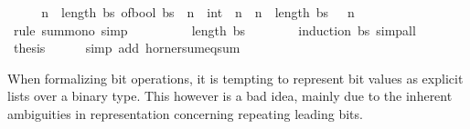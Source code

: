\begin{isabellebody}
%
\isadelimproof
%
\endisadelimproof
%
\isatagproof
{}\isamarkupfalse%
\ {\isacharminus}{\kern0pt}\isanewline
\ \ \isamarkupfalse%
\ {\isacartoucheopen}{\isacharparenleft}{\kern0pt}{\isasymSum}n\ {\isacharequal}{\kern0pt}\ {}{\isachardot}{\kern0pt}{\isachardot}{\kern0pt}{\isacharless}{\kern0pt}length\ bs{\isachardot}{\kern0pt}\ of{\isacharunderscore}{\kern0pt}bool\ {\isacharparenleft}{\kern0pt}bs\ {\isacharbang}{\kern0pt}\ n{\isacharparenright}{\kern0pt}\ {\isacharasterisk}{\kern0pt}\ {\isacharparenleft}{\kern0pt}{}{\isacharcolon}{\kern0pt}{\isacharcolon}{\kern0pt}int{\isacharparenright}{\kern0pt}\ {\isacharcircum}{\kern0pt}\ n{\isacharparenright}{\kern0pt}\ {\isasymle}\ {\isacharparenleft}{\kern0pt}{\isasymSum}n\ {\isacharequal}{\kern0pt}\ {}{\isachardot}{\kern0pt}{\isachardot}{\kern0pt}{\isacharless}{\kern0pt}length\ bs{\isachardot}{\kern0pt}\ {}\ {\isacharcircum}{\kern0pt}\ n{\isacharparenright}{\kern0pt}{\isacartoucheclose}\isanewline
\ \ \ \ \isamarkupfalse%
\ {\isacharparenleft}{\kern0pt}rule\ sum{\isacharunderscore}{\kern0pt}mono{\isacharparenright}{\kern0pt}\ simp\isanewline
\ \ \isamarkupfalse%
\ \isamarkupfalse%
\ {\isacartoucheopen}{\isasymdots}\ {\isacharequal}{\kern0pt}\ {}\ {\isacharcircum}{\kern0pt}\ length\ bs\ {\isacharminus}{\kern0pt}\ {}{\isacartoucheclose}\isanewline
\ \ \ \ \isamarkupfalse%
\ {\isacharparenleft}{\kern0pt}induction\ bs{\isacharparenright}{\kern0pt}\ simp{\isacharunderscore}{\kern0pt}all\isanewline
\ \ \isamarkupfalse%
\ \isamarkupfalse%
\ {\isacharquery}{\kern0pt}thesis\isanewline
\ \ \ \ \isamarkupfalse%
\ {\isacharparenleft}{\kern0pt}simp\ add{\isacharcolon}{\kern0pt}\ horner{\isacharunderscore}{\kern0pt}sum{\isacharunderscore}{\kern0pt}eq{\isacharunderscore}{\kern0pt}sum{\isacharparenright}{\kern0pt}\isanewline
{}\isamarkupfalse%
%
\endisatagproof
{\isafoldproof}%
%
\isadelimproof
%
\endisadelimproof
%
\isadelimdocument
%
\endisadelimdocument
%
\isatagdocument
%
\isamarkuptrue%
%
\endisatagdocument
{\isafolddocument}%
%
\isadelimdocument
%
\endisadelimdocument
%
\begin{isamarkuptext}%
When formalizing bit operations, it is tempting to represent
bit values as explicit lists over a binary type. This however
is a bad idea, mainly due to the inherent ambiguities in
representation concerning repeating leading bits.


\end{isamarkuptext}
\end{isabellebody}
